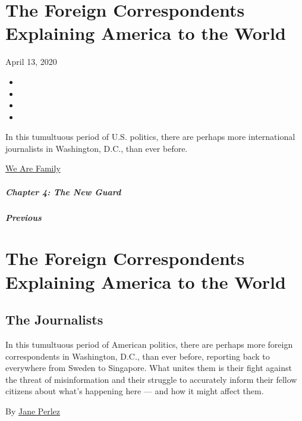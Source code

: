 \hypertarget{the-foreign-correspondents-explaining-america-to-the-world}{%
\section{The Foreign Correspondents Explaining America to the
World}\label{the-foreign-correspondents-explaining-america-to-the-world}}

April 13, 2020

\begin{itemize}
\item
\item
\item
\item
\end{itemize}

In this tumultuous period of U.S. politics, there are perhaps more
international journalists in Washington, D.C., than ever before.

\href{https://www.nytimes3xbfgragh.onion/interactive/2020/04/13/t-magazine/culture-issue-2020.html}{We
Are Family}

\hypertarget{chapter-4-the-new-guard}{%
\subparagraph{Chapter 4: The New Guard}\label{chapter-4-the-new-guard}}

\hypertarget{previous}{%
\subparagraph{Previous}\label{previous}}

\hypertarget{the-foreign-correspondents-explaining-america-to-the-world-1}{%
\section{The Foreign Correspondents Explaining America to the
World}\label{the-foreign-correspondents-explaining-america-to-the-world-1}}

\hypertarget{the-journalists}{%
\subsection{The Journalists}\label{the-journalists}}

In this tumultuous period of American politics, there are perhaps more
foreign correspondents in Washington, D.C., than ever before, reporting
back to everywhere from Sweden to Singapore. What unites them is their
fight against the threat of misinformation and their struggle to
accurately inform their fellow citizens about what's happening here ---
and how it might affect them.

By \href{https://www.nytimes3xbfgragh.onion/by/jane-perlez}{Jane Perlez}


